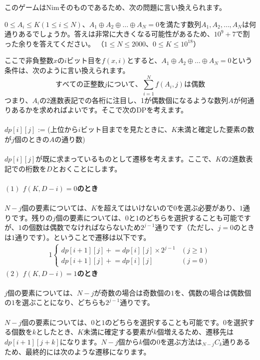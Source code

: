 \documentclass{ujreport}
\begin{document}
\noindent
このゲームはNimそのものであるため、次の問題に言い換えられます。
\begin{screen}
$ 0 \le A_i \le K(1 \le i \le N) $、$ A_1 \oplus A_2 \oplus \ldots \oplus A_N = 0 $を満たす数列$A_1, A_2, \ldots, A_N$は何通りあるでしょうか。答えは非常に大きくなる可能性があるため、$10^9+7$で割った余りを答えてください。
（$1 \le N \le 2000$、$0 \le K \le 10^{18}$）
\end{screen}
ここで非負整数$x$の$i$ビット目を$f(x, i)$とすると、$ A_1 \oplus A_2 \oplus \ldots \oplus A_N = 0 $という条件は、次のように言い換えられます。
$$ すべての正整数jについて、\sum_{i=1}^{N} f(A_i, j)は偶数 $$
つまり、$A_i$の2進数表記での各桁に注目し、1が偶数個になるような数列$A$が何通りあるかを求めればよいです。そこで次のDPを考えます。
\\\\
$dp[i][j]$ := (上位から$i$ビット目までを見たときに、$K$未満と確定した要素の数が$j$個のときの$A$の通り数)
\\\\
$dp[i][j]$が既に求まっているものとして遷移を考えます。ここで、$K$の2進数表記での桁数を$D$とおくことにします。
\\\\
{\bf $(1)$ $f(K, D - i) = 0$のとき}
\\\\
$N - j$個の要素については、$K$を超えてはいけないので$0$を選ぶ必要があり、$1$通りです。残りの$j$個の要素については、$0$と$1$のどちらを選択することも可能ですが、$1$の個数は偶数でなければならないため$2^{j-1}$通りです（ただし、$j=0$のときは$1$通りです）。ということで遷移は以下です。
\begin{alignat*}{1}
\left\{
\begin{array}{ll}
dp[i + 1][j] \mathrel{+}= dp[i][j] \times 2^{j-1} &(j \ge 1)\\
dp[i + 1][j] \mathrel{+}= dp[i][j] &(j = 0)
\end{array}
\right.
\end{alignat*}
{\bf $(2)$ $f(K, D - i) = 1$のとき}
\\\\
$j$個の要素については、$N - j$が奇数の場合は奇数個の$1$を、偶数の場合は偶数個の$1$を選ぶことになり、どちらも$2^{j-1}$通りです。\\\\
$N-j$個の要素については、$0$と$1$のどちらを選択することも可能です。$0$を選択する個数を$k$としたとき、$K$未満に確定する要素が$k$個増えるため、遷移先は$dp[i + 1][j + k]$になります。$N-j$個から$k$個の$0$を選ぶ方法は$_{N-j}C_k$通りあるため、最終的には次のような遷移になります。
\end{document}
